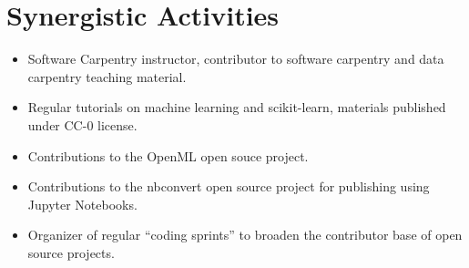 \section*{Synergistic Activities}
\begin{itemize}
\item Software Carpentry instructor, contributor to software carpentry and data
    carpentry teaching material.
\item Regular tutorials on machine learning and scikit-learn, materials published under CC-0 license.
\item Contributions to the OpenML open souce project.
\item Contributions to the nbconvert open source project for publishing using Jupyter Notebooks.
\item Organizer of regular ``coding sprints'' to broaden the contributor base of open source projects.
\end{itemize}
